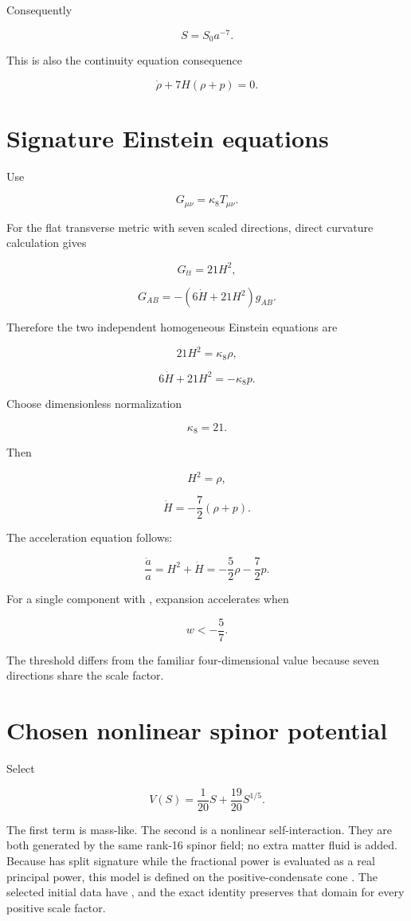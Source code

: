 \documentclass[11pt]{article}
\begin{document}
Consequently

\[
\boxed{S=S_0a^{-7}.}
\]

This is also the continuity equation consequence

\[
\dot\rho+7H(\rho+p)=0.
\]

\section{Signature \texttt{} Einstein equations}

Use

\[
G_{\mu\nu}=\kappa_8 T_{\mu\nu}.
\]

For the flat transverse metric with seven scaled directions, direct curvature calculation gives

\[
\boxed{G_{tt}=21H^2,}
\]

\[
\boxed{G_{AB}=-(6\dot H+21H^2)g_{AB}.}
\]

Therefore the two independent homogeneous Einstein equations are

\[
21H^2=\kappa_8\rho,
\]

\[
6\dot H+21H^2=-\kappa_8p.
\]

Choose dimensionless normalization

\[
\kappa_8=21.
\]

Then

\[
\boxed{H^2=\rho,}
\]

\[
\boxed{\dot H=-\frac72(\rho+p).}
\]

The acceleration equation follows:

\[
\frac{\ddot a}{a}=H^2+\dot H
=-\frac52\rho-\frac72p.
\]

For a single component with \texttt{}, expansion accelerates when

\[
\boxed{w<-\frac57.}
\]

The threshold differs from the familiar four-dimensional value \texttt{} because seven directions share the scale factor.

\section{Chosen nonlinear spinor potential}

Select

\[
\boxed{
V(S)=\frac1{20}S+\frac{19}{20}S^{1/5}.}
\]

The first term is mass-like. The second is a nonlinear self-interaction. They are both generated by the same rank-16 spinor field; no extra matter fluid is added. Because \texttt{} has split signature while the fractional power is evaluated as a real principal power, this model is defined on the positive-condensate cone \texttt{}. The selected initial data have \texttt{}, and the exact identity \texttt{} preserves that domain for every positive scale factor.
\end{document}
